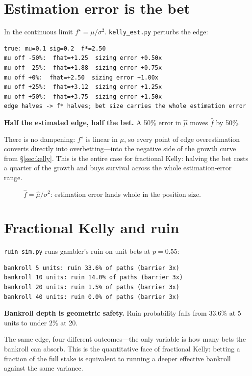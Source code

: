 \section{Estimation error is the bet}\label{sec:kest}

In the continuous limit $f^\star=\mu/\sigma^2$. \texttt{kelly\_est.py} perturbs the edge:
\begin{lstlisting}[numbers=none]
true: mu=0.1 sig=0.2  f*=2.50
mu off -50%:  fhat=+1.25  sizing error +0.50x
mu off -25%:  fhat=+1.88  sizing error +0.75x
mu off +0%:  fhat=+2.50  sizing error +1.00x
mu off +25%:  fhat=+3.12  sizing error +1.25x
mu off +50%:  fhat=+3.75  sizing error +1.50x
edge halves -> f* halves; bet size carries the whole estimation error
\end{lstlisting}

\begin{example}\label{ex:kest}
\textbf{Half the estimated edge, half the bet.} A 50\% error in $\hat\mu$ moves $\hat f$
by 50\%.
\begin{solution}
There is no dampening: $f^\star$ is linear in $\mu$, so every point of edge overestimation
converts directly into overbetting---into the negative side of the growth curve from
\S\ref{sec:kelly}. This is the entire case for fractional Kelly: halving the bet costs
a quarter of the growth and buys survival across the whole estimation-error range.
\end{solution}
\end{example}

\begin{figure}[htbp]\centering

\caption{$\hat f=\hat\mu/\sigma^2$: estimation error lands whole in the position size.}
\label{fig:kest}
\end{figure}

\section{Fractional Kelly and ruin}\label{sec:frac}

\texttt{ruin\_sim.py} runs gambler's ruin on unit bets at $p{=}0.55$:
\begin{lstlisting}[numbers=none]
bankroll 5 units: ruin 33.6% of paths (barrier 3x)
bankroll 10 units: ruin 14.0% of paths (barrier 3x)
bankroll 20 units: ruin 1.5% of paths (barrier 3x)
bankroll 40 units: ruin 0.0% of paths (barrier 3x)
\end{lstlisting}

\begin{example}\label{ex:ruin}
\textbf{Bankroll depth is geometric safety.} Ruin probability falls from $33.6\%$ at
5 units to under $2\%$ at 20.
\begin{solution}
The same edge, four different outcomes---the only variable is how many bets the bankroll
can absorb. This is the quantitative face of fractional Kelly: betting a fraction of the
full stake is equivalent to running a deeper effective bankroll against the same variance.
\end{solution}
\end{example}


